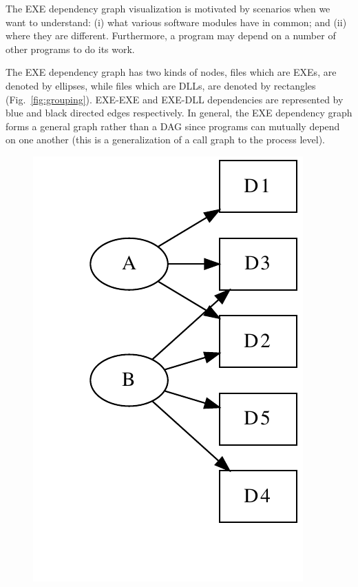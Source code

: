 The EXE dependency graph visualization is motivated by scenarios when
we want to understand: (i) what various software modules have in common;
and (ii) where they are different.
Furthermore, a program may depend
on a number of other programs to do its work.

The EXE dependency graph has two kinds of nodes,
files which are EXEs, are denoted by ellipses, while
files which are DLLs, are denoted by rectangles
(Fig.~\ref{fig:grouping}).
EXE-EXE and EXE-DLL dependencies are represented by
blue and black directed edges respectively.
In general, the EXE dependency graph forms a general graph rather than a
DAG since programs can mutually depend on one another
(this is a generalization of a call graph to the process level).

\begin{figure}
\centering
\includegraphics[scale=0.4]{depvis/example-split.pdf}
\hspace{15mm}

\end{figure}
